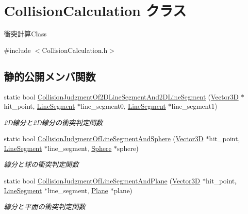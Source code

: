 \hypertarget{class_collision_calculation}{}\section{Collision\+Calculation クラス}
\label{class_collision_calculation}


衝突計算\+Class  




{\ttfamily \#include $<$Collision\+Calculation.\+h$>$}

\subsection*{静的公開メンバ関数}
\begin{DoxyCompactItemize}
\item 
static bool \mbox{\hyperlink{class_collision_calculation_a473d42596db3c94e4779eb44a1ddf42b}{Collision\+Judgment\+Of2\+D\+Line\+Segment\+And2\+D\+Line\+Segment}} (\mbox{\hyperlink{class_vector3_d}{Vector3D}} $\ast$hit\+\_\+point, \mbox{\hyperlink{class_line_segment}{Line\+Segment}} $\ast$line\+\_\+segment0, \mbox{\hyperlink{class_line_segment}{Line\+Segment}} $\ast$line\+\_\+segment1)
\begin{DoxyCompactList}\small\item\em 2\+D線分と2\+D線分の衝突判定関数 \end{DoxyCompactList}\item 
static bool \mbox{\hyperlink{class_collision_calculation_a150c5411ae4cb28dc57e6622682494d2}{Collision\+Judgment\+Of\+Line\+Segment\+And\+Sphere}} (\mbox{\hyperlink{class_vector3_d}{Vector3D}} $\ast$hit\+\_\+point, \mbox{\hyperlink{class_line_segment}{Line\+Segment}} $\ast$line\+\_\+segment, \mbox{\hyperlink{class_sphere}{Sphere}} $\ast$sphere)
\begin{DoxyCompactList}\small\item\em 線分と球の衝突判定関数 \end{DoxyCompactList}\item 
static bool \mbox{\hyperlink{class_collision_calculation_ac43bbd41b81341d9aa5009744c45d61d}{Collision\+Judgment\+Of\+Line\+Segment\+And\+Plane}} (\mbox{\hyperlink{class_vector3_d}{Vector3D}} $\ast$hit\+\_\+point, \mbox{\hyperlink{class_line_segment}{Line\+Segment}} $\ast$line\+\_\+segment, \mbox{\hyperlink{class_plane}{Plane}} $\ast$plane)
\begin{DoxyCompactList}\small\item\em 線分と平面の衝突判定関数 \end{DoxyCompactList}\item 

\end{DoxyCompactItemize}
